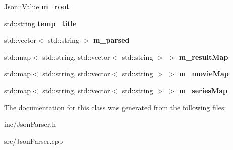 \begin{DoxyCompactItemize}
\item 
\mbox{\label{classJsonParser_ae5a993adef29a11237804dfd3de9fd50}} 
Json\+::\+Value {\bfseries m\+\_\+root}
\item 
\mbox{\label{classJsonParser_a1947ab7e13cc7917154d7d8aea23f777}} 
std\+::string {\bfseries temp\+\_\+title}
\item 
\mbox{\label{classJsonParser_a33e76488d7685330236a52de4a186aba}} 
std\+::vector$<$ std\+::string $>$ {\bfseries m\+\_\+parsed}
\item 
\mbox{\label{classJsonParser_ad89def06854ea0cf7d21e5d94ad35791}} 
std\+::map$<$ std\+::string, std\+::vector$<$ std\+::string $>$ $>$ {\bfseries m\+\_\+result\+Map}
\item 
\mbox{\label{classJsonParser_aa06f285831e0dfeb1218ccdd4a9de41b}} 
std\+::map$<$ std\+::string, std\+::vector$<$ std\+::string $>$ $>$ {\bfseries m\+\_\+movie\+Map}
\item 
\mbox{\label{classJsonParser_abfa68a2950074daa8b3e64818d104d63}} 
std\+::map$<$ std\+::string, std\+::vector$<$ std\+::string $>$ $>$ {\bfseries m\+\_\+series\+Map}
\end{DoxyCompactItemize}


The documentation for this class was generated from the following files\+:\begin{DoxyCompactItemize}
\item 
inc/Json\+Parser.\+h\item 
src/Json\+Parser.\+cpp\end{DoxyCompactItemize}
